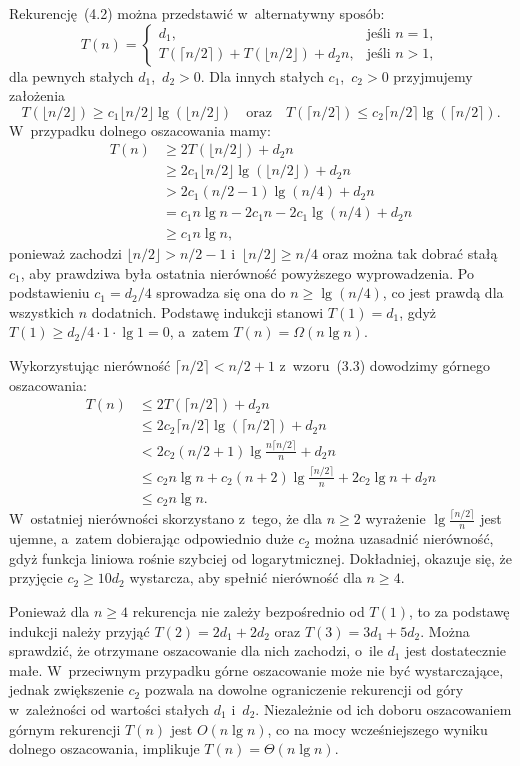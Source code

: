 \exercise %
Rekurencję~(4.2) można przedstawić w~alternatywny sposób:
\[
	T(n) =
	\begin{cases}
		d_1, & \text{jeśli $n=1$}, \\
		T(\lceil n/2\rceil)+T(\lfloor n/2\rfloor)+d_2n, & \text{jeśli $n>1$},
	\end{cases}
\]
dla pewnych stałych $d_1$,~$d_2>0$. Dla innych stałych $c_1$,~$c_2>0$ przyjmujemy założenia
\[
	T(\lfloor n/2\rfloor) \ge c_1\lfloor n/2\rfloor\lg(\lfloor n/2\rfloor) \quad\text{oraz}\quad T(\lceil n/2\rceil) \le c_2\lceil n/2\rceil\lg(\lceil n/2\rceil).
\]
W~przypadku dolnego oszacowania mamy:
\begin{align*}
	T(n) &\ge 2T(\lfloor n/2\rfloor)+d_2n \\
	&\ge 2c_1\lfloor n/2\rfloor\lg(\lfloor n/2\rfloor)+d_2n \\
	&> 2c_1(n/2-1)\lg(n/4)+d_2n \\
	&= c_1n\lg n-2c_1n-2c_1\!\lg(n/4)+d_2n \\
	&\ge c_1n\lg n,
\end{align*}
ponieważ zachodzi $\lfloor n/2\rfloor>n/2-1$ i~$\lfloor n/2\rfloor\ge n/4$ oraz można tak dobrać stałą $c_1$, aby prawdziwa była ostatnia nierówność powyższego wyprowadzenia. Po podstawieniu $c_1=d_2/4$ sprowadza się ona do $n\ge\lg(n/4)$, co jest prawdą dla wszystkich $n$ dodatnich. Podstawę indukcji stanowi $T(1)=d_1$, gdyż $T(1)\ge d_2/4\cdot 1\cdot\lg1=0$, a~zatem $T(n)=\Omega(n\lg n)$.

Wykorzystując nierówność $\lceil n/2\rceil<n/2+1$ z~wzoru~(3.3) dowodzimy górnego oszacowania:
\begin{align*}
	T(n) &\le 2T(\lceil n/2\rceil)+d_2n \\
	&\le 2c_2\lceil n/2\rceil\lg(\lceil n/2\rceil)+d_2n \\
	&< 2c_2(n/2+1)\lg\frac{n\lceil n/2\rceil}{n}+d_2n \\
	&\le c_2n\lg n+c_2(n+2)\lg\frac{\lceil n/2\rceil}{n}+2c_2\lg n+d_2n \\
	&\le c_2n\lg n.
\end{align*}
W~ostatniej nierówności skorzystano z~tego, że dla $n\ge2$ wyrażenie $\lg\frac{\lceil n/2\rceil}{n}$ jest ujemne, a~zatem dobierając odpowiednio duże $c_2$ można uzasadnić nierówność, gdyż funkcja liniowa rośnie szybciej od logarytmicznej. Dokładniej, okazuje się, że przyjęcie $c_2\ge10d_2$ wystarcza, aby spełnić nierówność dla $n\ge4$.

Ponieważ dla $n\ge4$ rekurencja nie zależy bezpośrednio od $T(1)$, to za podstawę indukcji należy przyjąć $T(2)=2d_1+2d_2$ oraz $T(3)=3d_1+5d_2$. Można sprawdzić, że otrzymane oszacowanie dla nich zachodzi, o~ile $d_1$ jest dostatecznie małe. W~przeciwnym przypadku górne oszacowanie może nie być wystarczające, jednak zwiększenie $c_2$ pozwala na dowolne ograniczenie rekurencji od góry w~zależności od wartości stałych $d_1$ i~$d_2$. Niezależnie od ich doboru oszacowaniem górnym rekurencji $T(n)$ jest $O(n\lg n)$, co na mocy wcześniejszego wyniku dolnego oszacowania, implikuje $T(n)=\Theta(n\lg n)$.

